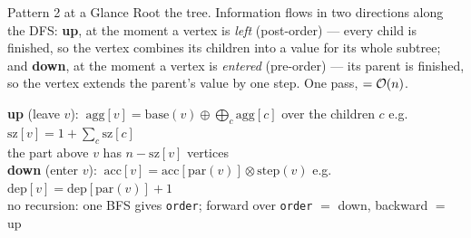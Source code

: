 \begin{patternbox}{Pattern 2 at a Glance}
Root the tree. Information flows in two directions along the DFS: \textbf{up}, at the moment a vertex is \emph{left} (post-order) --- every child is finished, so the vertex combines its children into a value for its whole subtree; and \textbf{down}, at the moment a vertex is \emph{entered} (pre-order) --- its parent is finished, so the vertex extends the parent's value by one step. One pass, \VE{} $= \mathcal{O}(n)$.

\begin{center}
\end{center}
\begin{recurrencebox}
\centering\small
\textbf{up} (leave $v$): $\ \mathrm{agg}[v] = \mathrm{base}(v) \oplus \textstyle\bigoplus_{c} \mathrm{agg}[c]$ over the children $c$
\qquad e.g.\ $\mathrm{sz}[v] = 1 + \sum_c \mathrm{sz}[c]$\\[3pt]
the part above $v$ has $n - \mathrm{sz}[v]$ vertices\\[3pt]
\textbf{down} (enter $v$): $\ \mathrm{acc}[v] = \mathrm{acc}[\mathrm{par}(v)] \otimes \mathrm{step}(v)$
\qquad e.g.\ $\mathrm{dep}[v] = \mathrm{dep}[\mathrm{par}(v)] + 1$\\[3pt]
no recursion: one BFS gives \texttt{order}; forward over \texttt{order} $=$ down, backward $=$ up
\end{recurrencebox}
\end{patternbox}

